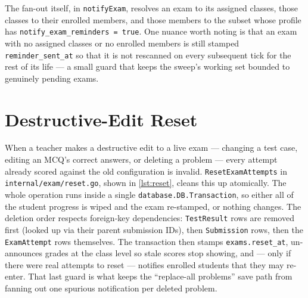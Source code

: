 The fan-out itself, in \texttt{notifyExam}, resolves an exam to its assigned classes, those classes to their enrolled members, and those members to the subset whose profile has \texttt{notify\_exam\_reminders = true}. One nuance worth noting is that an exam with no assigned classes or no enrolled members is still stamped \texttt{reminder\_sent\_at} so that it is not rescanned on every subsequent tick for the rest of its life --- a small guard that keeps the sweep's working set bounded to genuinely pending exams.

\section{Destructive-Edit Reset}\label{sec:ap-d-reset}

When a teacher makes a destructive edit to a live exam --- changing a test case, editing an MCQ's correct answers, or deleting a problem --- every attempt already scored against the old configuration is invalid. \texttt{ResetExamAttempts} in \texttt{internal/exam/reset.go}, shown in \cref{lst:reset}, cleans this up atomically. The whole operation runs inside a single \texttt{database.DB.Transaction}, so either all of the student progress is wiped and the exam re-stamped, or nothing changes. The deletion order respects foreign-key dependencies: \texttt{TestResult} rows are removed first (looked up via their parent submission IDs), then \texttt{Submission} rows, then the \texttt{ExamAttempt} rows themselves. The transaction then stamps \texttt{exams.reset\_at}, un-announces grades at the class level so stale scores stop showing, and --- only if there were real attempts to reset --- notifies enrolled students that they may re-enter. That last guard is what keeps the ``replace-all problems'' save path from fanning out one spurious notification per deleted problem.

